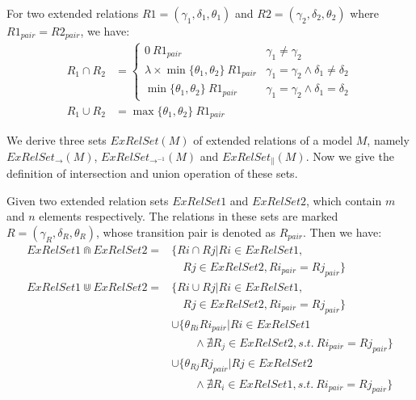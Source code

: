 \documentclass{llncs}
\begin{document}
For two extended relations $R1=(\gamma_{1},\delta_{1},\theta_{1})$ and $R2=(\gamma_{2},\delta_{2},\theta_{2})$ where $R1_{pair}=R2_{pair}$, we have:
\begin{equation}\label{eq:relationOperations}
	\begin{aligned}
		R_{1}\cap R_{2}&=
			\begin{cases}
				0~R1_{pair}&	\gamma_{1}\neq\gamma_{2}\\
				\lambda\times\min\{\theta_{1},\theta_{2}\}~R1_{pair}&	\gamma_{1}=\gamma_{2}\wedge\delta_{1}\neq\delta_{2}\\
				\min\{\theta_{1},\theta_{2}\}~R1_{pair}&	\gamma_{1}=\gamma_{2}\wedge\delta_{1}=\delta_{2}
			\end{cases}\\
		R_{1}\cup R_{2}&=	\max\{\theta_{1},\theta_{2}\}~R1_{pair}
	\end{aligned}
\end{equation}

We derive three sets $ExRelSet(M)$ of extended relations of a model $M$, namely $ExRelSet_{\rightarrow}(M)$, $ExRelSet_{\rightarrow^{-1}}(M)$ and $ExRelSet_{\parallel}(M)$. Now we give the definition of intersection and union operation of these sets.

\begin{definition}\label{def:relSetOperations}
Given two extended relation sets $ExRelSet1$ and $ExRelSet2$, which contain $m$ and $n$ elements respectively. The relations in these sets are marked $R=(\gamma_{R},\delta_{R},\theta_{R})$, whose transition pair is denoted as $R_{pair}$. Then we have:
	\begin{equation}\label{eq:relSetOperations}
		\begin{aligned}
			ExRelSet1\Cap ExRelSet2=&\{Ri\cap Rj|Ri\in ExRelSet1,\\
			&\quad Rj\in ExRelSet2,Ri_{pair}=Rj_{pair}\}\\
			ExRelSet1\Cup ExRelSet2=&\{Ri\cup Rj|Ri\in ExRelSet1,\\
			&\quad Rj\in ExRelSet2,Ri_{pair}=Rj_{pair}\}\\
			&\cup\{\theta_{Ri}Ri_{pair}|Ri\in ExRelSet1\\
			&\qquad \wedge\nexists R_{j}\in ExRelSet2,s.t.~Ri_{pair}=Rj_{pair}\}\\
			&\cup\{\theta_{Rj}Rj_{pair}|Rj\in ExRelSet2\\
			&\qquad \wedge\nexists R_{i}\in ExRelSet1,s.t.~Ri_{pair}=Rj_{pair}\}
		\end{aligned}
	\end{equation}
\end{definition}
\end{document}
